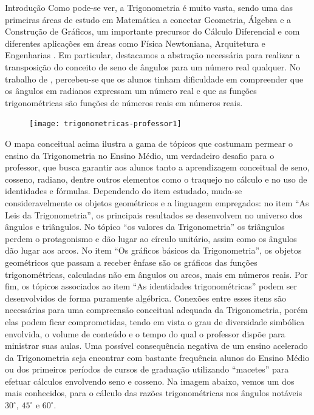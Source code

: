 \begin{apresentacao}{Introdução}
Como pode-se ver, a Trigonometria é muito vasta, sendo uma das primeiras áreas de estudo em Matemática a conectar Geometria, Álgebra e a Construção de Gráficos, um importante precursor do Cálculo Diferencial e com diferentes aplicações em áreas como Física Newtoniana, Arquitetura e Engenharias \citep{weber2005}. Em particular, destacamos a abstração necessária para realizar a transposição do conceito de seno de ângulos para um número real qualquer. No trabalho de \cite{orhun2010}, percebeu-se que os alunos tinham dificuldade em compreender que os ângulos em radianos expressam um número real e que as funções trigonométricas são funções de números reais em números reais.


\begin{figure}[H]
\centering

\texttt{[image: trigonometricas-professor1]}
\end{figure}

O mapa conceitual acima ilustra a gama de tópicos que costumam permear o ensino da Trigonometria no Ensino Médio, um verdadeiro desafio para o professor, que busca garantir aos alunos tanto a aprendizagem conceitual de seno, cosseno, radiano, dentre outros elementos como o traquejo no cálculo e no uso de identidades e fórmulas. Dependendo do item estudado, muda-se consideravelmente os objetos geométricos e a linguagem empregados: no item “As Leis da Trigonometria”, os principais resultados se desenvolvem no universo dos ângulos e triângulos. No tópico “os valores da Trigonometria”{} os triângulos perdem o protagonismo e dão lugar ao círculo unitário, assim como os ângulos dão lugar aos arcos. No item “Os gráficos básicos da Trigonometria”, os objetos geométricos que passam a receber ênfase são os gráficos das funções trigonométricas, calculadas não em ângulos ou arcos, mais em números reais. Por fim, os tópicos associados ao item “As identidades trigonométricas”{} podem ser desenvolvidos de forma puramente algébrica. Conexões entre esses itens são necessárias para uma compreensão conceitual adequada da Trigonometria, porém elas podem ficar comprometidas, tendo em vista o grau de diversidade simbólica envolvida, o volume de conteúdo e o tempo do qual o professor dispõe para ministrar suas aulas. Uma possível consequência negativa de um ensino acelerado da Trigonometria seja encontrar com bastante frequência alunos do Ensino Médio ou dos primeiros períodos de cursos de graduação utilizando “macetes”{} para efetuar cálculos envolvendo seno e cosseno. Na imagem abaixo, vemos um dos mais conhecidos, para o cálculo das razões trigonométricas nos ângulos notáveis $30^{\circ}$, $45^{\circ}$ e $60^{\circ}$.



\end{apresentacao}
